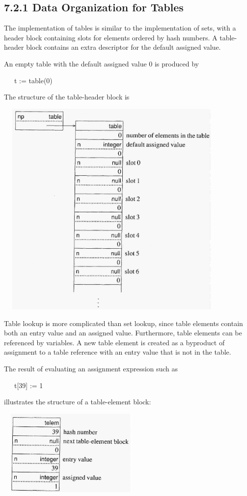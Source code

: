\subsection[7.2.1 Data Organization for Tables]{7.2.1 Data Organization for Tables}

The implementation of tables is similar to the implementation of sets,
with a header block containing slots for elements ordered by hash
numbers. A table-header block contains an extra descriptor for the
default assigned value.

An empty table with the default assigned value 0 is produced by

{\ttfamily\mdseries
\ \ \ t := table(0)}

The structure of the table-header block is

\ \  \includegraphics[width=4.2752in,height=4.2417in]{ib-img/ib-img037.jpg} 

Table lookup is more complicated than set lookup, since table elements
contain both an entry value and an assigned value. Furthermore, table
elements can be referenced by variables. A new table element is
created as a byproduct of assignment to a table reference with an
entry value that is not in the table.

The result of evaluating an assignment expression such as

{\ttfamily\mdseries
\ \ \ t[39] := 1}

\noindent illustrates the structure of a table-element block:

\ \  \includegraphics[width=2.5654in,height=1.6634in]{ib-img/ib-img038.jpg} 

